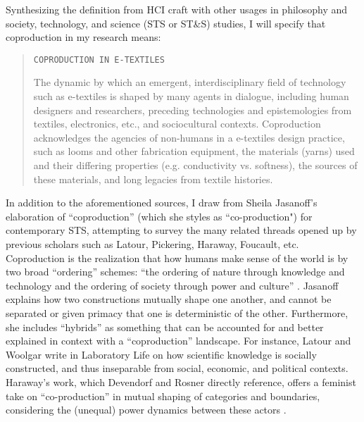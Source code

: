 Synthesizing the definition from HCI craft with other usages in philosophy and society, technology, and science (STS or ST\&S) studies, I will specify that coproduction in my research means:

\noindent\begin{minipage}{\linewidth}
  \begin{quote}
    
  \texttt{COPRODUCTION IN E-TEXTILES}

  The dynamic by which an emergent, interdisciplinary field of technology such as e-textiles is shaped by many agents in dialogue, including human designers and researchers, preceding technologies and epistemologies from textiles, electronics, etc., and sociocultural contexts. Coproduction acknowledges the agencies of non-humans in a e-textiles design practice, such as looms and other fabrication equipment, the materials (yarns) used and their differing properties (e.g. conductivity vs. softness), the sources of these materials, and long legacies from textile histories.
  \end{quote}
\end{minipage}

In addition to the aforementioned sources, I draw from Sheila Jasanoff's elaboration of ``coproduction'' (which she styles as ``co-production") for contemporary STS, attempting to survey the many related threads opened up by previous scholars such as Latour, Pickering, Haraway, Foucault, etc. Coproduction is the realization that how humans make sense of the world is by two broad ``ordering'' schemes: ``the ordering of nature through knowledge and technology and the ordering of society through power and culture'' \cite{jasanoff_states_2010}. Jasanoff explains how two constructions mutually shape one another, and cannot be separated or given primacy that one is deterministic of the other. Furthermore, she includes ``hybrids'' as something that can be accounted for and better explained in context with a ``coproduction'' landscape. For instance, Latour and Woolgar write in Laboratory Life \cite{latour_laboratory_2013} on how scientific knowledge is socially constructed, and thus inseparable from social, economic, and political contexts. Haraway's work, which Devendorf and Rosner directly reference, offers a feminist take on ``co-production'' in mutual shaping of categories and boundaries, considering the (unequal) power dynamics between these actors \cite{haraway_staying_2016}. 

